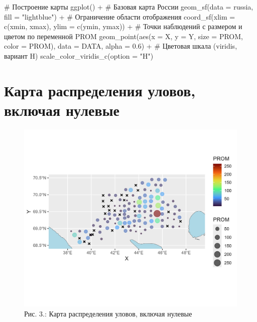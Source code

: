 \documentclass[
  letterpaper,
  DIV=11,
  numbers=noendperiod]{scrreprt}
\newenvironment{Shaded}{\begin{snugshade}}{\end{snugshade}}
\newcommand{\AttributeTok}[1]{\textcolor[rgb]{0.40,0.45,0.13}{#1}}
\newcommand{\CommentTok}[1]{\textcolor[rgb]{0.37,0.37,0.37}{#1}}
\newcommand{\FloatTok}[1]{\textcolor[rgb]{0.68,0.00,0.00}{#1}}
\newcommand{\FunctionTok}[1]{\textcolor[rgb]{0.28,0.35,0.67}{#1}}
\newcommand{\NormalTok}[1]{\textcolor[rgb]{0.00,0.23,0.31}{#1}}
\newcommand{\SpecialCharTok}[1]{\textcolor[rgb]{0.37,0.37,0.37}{#1}}
\newcommand{\StringTok}[1]{\textcolor[rgb]{0.13,0.47,0.30}{#1}}
\begin{document}
\begin{Shaded}
\begin{Highlighting}[]
\CommentTok{\# Построение карты}
\FunctionTok{ggplot}\NormalTok{() }\SpecialCharTok{+}
  \CommentTok{\# Базовая карта России}
  \FunctionTok{geom\_sf}\NormalTok{(}\AttributeTok{data =}\NormalTok{ russia, }\AttributeTok{fill =} \StringTok{"lightblue"}\NormalTok{) }\SpecialCharTok{+} 
  \CommentTok{\# Ограничение области отображения}
  \FunctionTok{coord\_sf}\NormalTok{(}\AttributeTok{xlim =} \FunctionTok{c}\NormalTok{(xmin, xmax), }\AttributeTok{ylim =} \FunctionTok{c}\NormalTok{(ymin, ymax)) }\SpecialCharTok{+}
  \CommentTok{\# Точки наблюдений с размером и цветом по переменной PROM}
  \FunctionTok{geom\_point}\NormalTok{(}\FunctionTok{aes}\NormalTok{(}\AttributeTok{x =}\NormalTok{ X, }\AttributeTok{y =}\NormalTok{ Y, }\AttributeTok{size =}\NormalTok{ PROM, }\AttributeTok{color =}\NormalTok{ PROM),}
             \AttributeTok{data =}\NormalTok{ DATA, }\AttributeTok{alpha =} \FloatTok{0.6}\NormalTok{) }\SpecialCharTok{+}
  \CommentTok{\# Цветовая шкала (viridis, вариант H)}
  \FunctionTok{scale\_color\_viridis\_c}\NormalTok{(}\AttributeTok{option =} \StringTok{"H"}\NormalTok{)}
\end{Highlighting}
\end{Shaded}

\section{Карта распределения уловов, включая
нулевые}\label{ux43aux430ux440ux442ux430-ux440ux430ux441ux43fux440ux435ux434ux435ux43bux435ux43dux438ux44f-ux443ux43bux43eux432ux43eux432-ux432ux43aux43bux44eux447ux430ux44f-ux43dux443ux43bux435ux432ux44bux435}

\begin{figure}[H]

{\centering \includegraphics[width=0.7\linewidth,height=\textheight,keepaspectratio]{images/KARTOGRAPH3.jpg}

}

\caption{Рис. 3.: Карта распределения уловов, включая нулевые}

\end{figure}%
\end{document}
